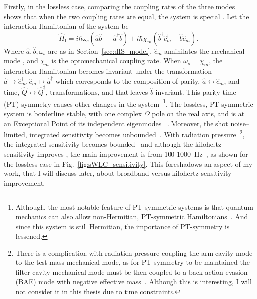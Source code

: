 Firstly, in the lossless case, comparing the coupling rates of the three modes shows that when the two coupling rates are equal, the system is special . Let the interaction Hamiltonian of the system be~\cite{} $$\hat{H}_\text{I}=i\hbar\omega_s(\hat{a}\hat{b}^\dag-\hat{a}^\dag\hat{b})+i\hbar\chi_m(\hat{b}^\dag\hat{c}_m^\dag-\hat{b}\hat{c}_m).$$ Where $\hat a, \hat b, \omega_s$ are as in Section~\ref{sec:dIS_model}, $\hat{c}_m$ annihilates the mechanical mode , and $\chi_m$ is the optomechanical coupling rate. When $\omega_s=\chi_m$, the interaction Hamiltonian becomes invariant under the transformation $\hat a\mapsto\hat{c}_m^\dag, \hat{c}_m\mapsto\hat a^\dag$ which corresponds to the composition of parity, $\hat a\leftrightarrow \hat{c}_m$, and time, $\hat Q\leftrightarrow \hat Q^\dag$, transformations, and that leaves $\hat b$ invariant. This parity-time (PT) symmetry causes other changes in the system~\footnote{Although, the most notable feature of PT-symmetric systems is that quantum mechanics can  also allow non-Hermitian, PT-symmetric Hamiltonians~\cite{}. And since this system is still Hermitian, the importance of PT-symmetry is lessened. }. 
The lossless, PT-symmetric system is borderline stable, with one complex $\Omega$ pole on the real axis, and is at an Exceptional Point of its independent eigenmodes~\cite{Li2020} . Moreover, the shot noise--limited, integrated sensitivity becomes unbounded~\cite{}. With radiation pressure~\footnote{There is a complication with radiation pressure coupling the arm cavity mode to the test mass mechanical mode, as for PT-symmetry to be maintained the filter cavity mechanical mode must be then coupled to a back-action evasion (BAE) mode with negative effective mass~\cite{}. Although this is interesting, I will not consider it in this thesis due to time constraints.}, the integrated sensitivity becomes bounded~\cite{} and although the kilohertz sensitivity improves , the main improvement is from 100-1000~Hz~\cite{}, as shown for the lossless case in Fig.~\ref{fig:sWLC_sensitivity}. This foreshadows an aspect of my work, that I will discuss later, about broadband versus kilohertz sensitivity improvement. 



